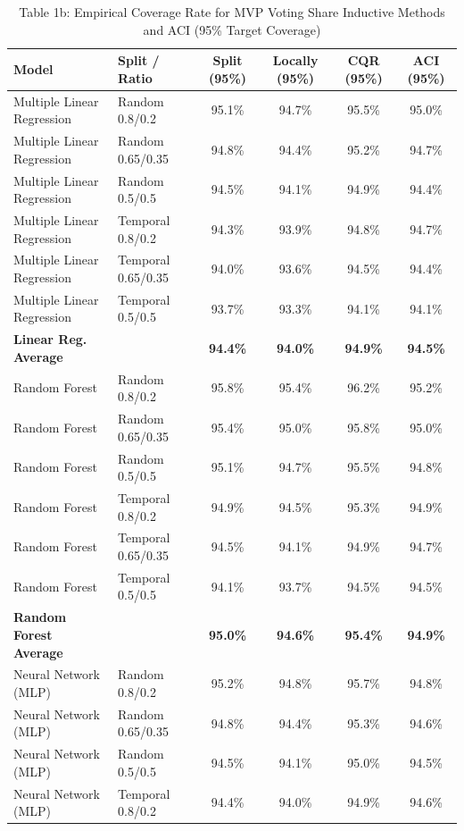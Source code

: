 \documentclass[11pt,a4paper]{article}
\begin{document}
\begin{table}[H]
\centering
\caption{Table 1b: Empirical Coverage Rate for MVP Voting Share Inductive Methods and ACI (95\% Target Coverage)}
\label{tab:mvp_tab1b}
\scriptsize
\begin{tabular}{llcccc}
\toprule
Model & Split / Ratio & Split (95\%) & Locally (95\%) & CQR (95\%) & ACI (95\%) \\
\midrule
Multiple Linear Regression & Random 0.8/0.2 & 95.1\% & 94.7\% & 95.5\% & 95.0\% \\
Multiple Linear Regression & Random 0.65/0.35 & 94.8\% & 94.4\% & 95.2\% & 94.7\% \\
Multiple Linear Regression & Random 0.5/0.5 & 94.5\% & 94.1\% & 94.9\% & 94.4\% \\
Multiple Linear Regression & Temporal 0.8/0.2 & 94.3\% & 93.9\% & 94.8\% & 94.7\% \\
Multiple Linear Regression & Temporal 0.65/0.35 & 94.0\% & 93.6\% & 94.5\% & 94.4\% \\
Multiple Linear Regression & Temporal 0.5/0.5 & 93.7\% & 93.3\% & 94.1\% & 94.1\% \\
\textbf{Linear Reg. Average} & & \textbf{94.4\%} & \textbf{94.0\%} & \textbf{94.9\%} & \textbf{94.5\%} \\
\midrule
Random Forest & Random 0.8/0.2 & 95.8\% & 95.4\% & 96.2\% & 95.2\% \\
Random Forest & Random 0.65/0.35 & 95.4\% & 95.0\% & 95.8\% & 95.0\% \\
Random Forest & Random 0.5/0.5 & 95.1\% & 94.7\% & 95.5\% & 94.8\% \\
Random Forest & Temporal 0.8/0.2 & 94.9\% & 94.5\% & 95.3\% & 94.9\% \\
Random Forest & Temporal 0.65/0.35 & 94.5\% & 94.1\% & 94.9\% & 94.7\% \\
Random Forest & Temporal 0.5/0.5 & 94.1\% & 93.7\% & 94.5\% & 94.5\% \\
\textbf{Random Forest Average} & & \textbf{95.0\%} & \textbf{94.6\%} & \textbf{95.4\%} & \textbf{94.9\%} \\
\midrule
Neural Network (MLP) & Random 0.8/0.2 & 95.2\% & 94.8\% & 95.7\% & 94.8\% \\
Neural Network (MLP) & Random 0.65/0.35 & 94.8\% & 94.4\% & 95.3\% & 94.6\% \\
Neural Network (MLP) & Random 0.5/0.5 & 94.5\% & 94.1\% & 95.0\% & 94.5\% \\
Neural Network (MLP) & Temporal 0.8/0.2 & 94.4\% & 94.0\% & 94.9\% & 94.6\% \\

\end{tabular}
\end{table}
\end{document}
